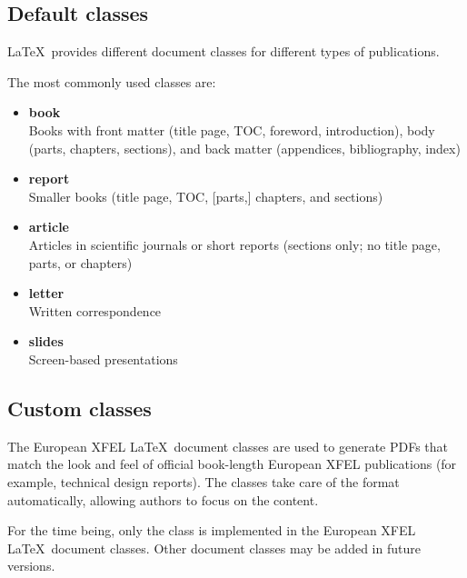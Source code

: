 \documentclass[]{xfel.eu-report}
\begin{document}
\subsection{Default classes}

\LaTeX\ provides different document classes for different types of publications.

The most commonly used classes are:

\begin{itemize}
\item {\bf book}\nopagebreak\\  
Books with front matter (title page, TOC, foreword, introduction), body (parts, chapters, sections), and back matter (appendices, bibliography, index)
\linebreak

\item {\bf report}\nopagebreak\\  
Smaller books (title page, TOC, [parts,] chapters, and sections)
\linebreak
\newpage
\item {\bf article}\nopagebreak\\  
Articles in scientific journals or short reports (sections only; no title page, parts, or chapters)
\linebreak

\item {\bf letter}\nopagebreak\\  
Written correspondence
\linebreak

\item {\bf slides}\nopagebreak\\  
Screen-based presentations
\end{itemize}


\subsection{Custom classes}

The European XFEL \LaTeX\ document classes are used to generate PDFs 
that match the look and feel of official book-length European XFEL publications 
(for example, technical design reports). The classes
take care of the format automatically, allowing authors to focus on the content.

For the time being, only the  class is implemented in the European
XFEL \LaTeX\ document classes. Other document classes may be added in
future versions.
\end{document}
